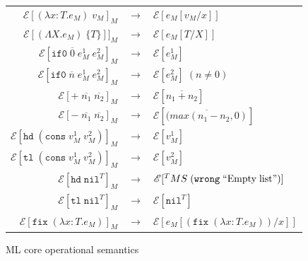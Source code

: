 \begin{figure}
\onehalfspacing
\begin{center}
\begin{tabular}{rcl}
$\mathscr{E}[(\lambda x:T.e_{M})\;v_{M}]_{M}$ & $\rightarrow$ & $\mathscr{E}[e_{M}[v_{M}/x]]$ \\
$\mathscr{E}[(\Lambda X.e_{M})\;\lbrace T\rbrace]]_{M}$ & $\rightarrow$ & $\mathscr{E}[e_{M}[T/X]]$ \\
$\mathscr{E}[\mathtt{if0}\;\overline{0}\;e_{M}^{1}\;e_{M}^{2}]_{M}$ & $\rightarrow$ & $\mathscr{E}[e_{M}^{1}]$ \\
$\mathscr{E}[\mathtt{if0}\;\overline{n}\;e_{M}^{1}\;e_{M}^{2}]_{M}$ & $\rightarrow$ & $\mathscr{E}[e_{M}^{2}]\;(n\neq0)$ \\
$\mathscr{E}[+\;\overline{n_{1}}\;\overline{n_{2}}]_{M}$ & $\rightarrow$ & $\mathscr{E}[\overline{n_{1}+n_{2}}]$ \\
$\mathscr{E}[-\;\overline{n_{1}}\;\overline{n_{2}}]_{M}$ & $\rightarrow$ & $\mathscr{E}[\overline{(max(n_{1}-n_{2},0)}]$ \\
$\mathscr{E}[\mathtt{hd}\;(\mathtt{cons}\;v_{M}^{1}\;v_{M}^{2})]_{M}$ & $\rightarrow$ & $\mathscr{E}[v_{M}^{1}]$ \\
$\mathscr{E}[\mathtt{tl}\;(\mathtt{cons}\;v_{M}^{1}\;v_{M}^{2})]_{M}$ & $\rightarrow$ & $\mathscr{E}[v_{M}^{2}]$ \\
$\mathscr{E}[\mathtt{hd}\;\mathtt{nil}^{T}]_{M}$ & $\rightarrow$ & $\mathscr{E}[^{T}MS\;(\mathtt{wrong}\;\mathrm{``Empty\;list"})]$ \\
$\mathscr{E}[\mathtt{tl}\;\mathtt{nil}^{T}]_{M}$ & $\rightarrow$ & $\mathscr{E}[\mathtt{nil}^{T}]$ \\
$\mathscr{E}[\mathtt{fix}\;(\lambda x:T.e_{M})]_{M}$ & $\rightarrow$ & $\mathscr{E}[e_{M}[(\mathtt{fix}\;(\lambda x:T.e_{M}))/x]]$
\end{tabular}
\end{center}
\caption{ML core operational semantics}
\label{fig:mcos}
\end{figure}